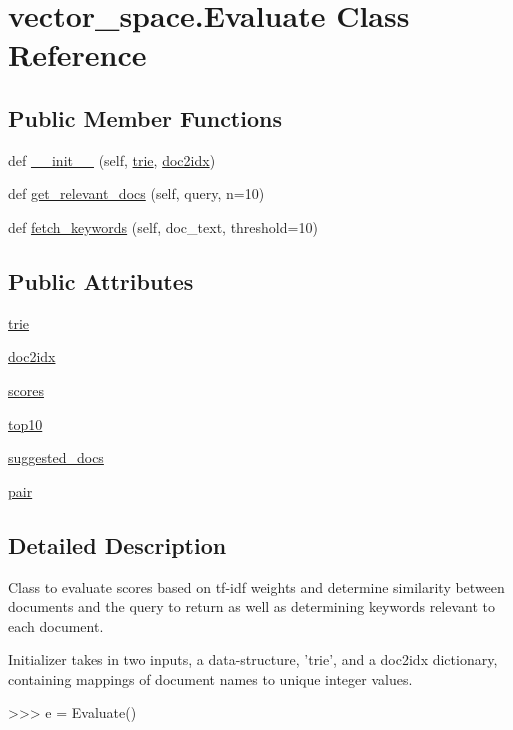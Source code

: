 \hypertarget{classvector__space_1_1_evaluate}{}\section{vector\+\_\+space.\+Evaluate Class Reference}
\label{classvector__space_1_1_evaluate}
\subsection*{Public Member Functions}
\begin{DoxyCompactItemize}
\item 
def \hyperlink{classvector__space_1_1_evaluate_a0e393062023dc2594bf9c76854f08185}{\+\_\+\+\_\+init\+\_\+\+\_\+} (self, \hyperlink{classvector__space_1_1_evaluate_a39fea1c78318d69c46a8aa6a402833bb}{trie}, \hyperlink{classvector__space_1_1_evaluate_afc5e4d8c38259c74dafaf897b1b85a8b}{doc2idx})
\item 
def \hyperlink{classvector__space_1_1_evaluate_aafcdd9a278f5cb4305d53b1c977c372d}{get\+\_\+relevant\+\_\+docs} (self, query, n=10)
\item 
def \hyperlink{classvector__space_1_1_evaluate_ac561d193195b176f1661334c8c42336b}{fetch\+\_\+keywords} (self, doc\+\_\+text, threshold=10)
\end{DoxyCompactItemize}
\subsection*{Public Attributes}
\begin{DoxyCompactItemize}
\item 
\hyperlink{classvector__space_1_1_evaluate_a39fea1c78318d69c46a8aa6a402833bb}{trie}
\item 
\hyperlink{classvector__space_1_1_evaluate_afc5e4d8c38259c74dafaf897b1b85a8b}{doc2idx}
\item 
\hyperlink{classvector__space_1_1_evaluate_af026d7004916dc38c845e4280b24cbd6}{scores}
\item 
\hyperlink{classvector__space_1_1_evaluate_a8e95a5f443892a2d8887f8ebc90476e3}{top10}
\item 
\hyperlink{classvector__space_1_1_evaluate_aa0eb502dc1bc16f2c190d744b08cd35c}{suggested\+\_\+docs}
\item 
\hyperlink{classvector__space_1_1_evaluate_a758e7d619ba10d43b691c12a43a1a1be}{pair}
\end{DoxyCompactItemize}


\subsection{Detailed Description}
\begin{DoxyVerb}Class to evaluate scores based on tf-idf weights and determine similarity
between documents and the query to return as well as determining keywords 
relevant to each document.

Initializer takes in two inputs, a data-structure, 'trie', and a doc2idx dictionary, 
containing mappings of document names to unique integer values.

>>> e = Evaluate()\end{DoxyVerb}
 

